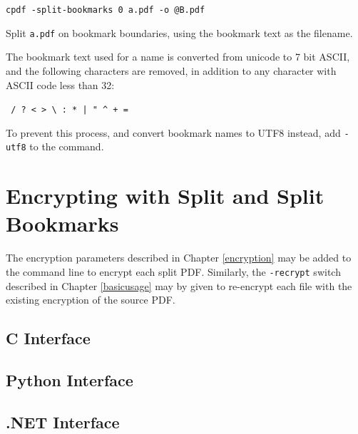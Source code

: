 \documentclass{book}
\begin{document}
  \begin{framed}\small
    \noindent\verb!cpdf -split-bookmarks 0 a.pdf -o @B.pdf!

    \vspace{2.5mm}
    \noindent Split \texttt{a.pdf} on bookmark boundaries, using the bookmark text as the filename.

  \end{framed}
\noindent The bookmark text used for a name is converted from unicode to 7 bit ASCII, and the following characters are removed, in addition to any character with ASCII code less than 32:
  \begin{framed}
  \centering
  \verb! / ? < > \ : * | " ^ + =!
  \end{framed}

\noindent To prevent this process, and convert bookmark names to UTF8 instead, add \texttt{-utf8} to the command.

\section{Encrypting with Split and Split Bookmarks}
The encryption parameters described in Chapter \ref{encryption} may be added to the command line to encrypt each split PDF. Similarly, the \texttt{-recrypt} switch described in Chapter \ref{basicusage} may by given to re-encrypt each file with the existing encryption of the source PDF. 
\pagestyle{empty}\thispagestyle{fancy}

\begin{cpdflib}
\clearpage
\section*{C Interface}
\begin{small}\tt

\end{small}
\end{cpdflib}

\begin{pycpdflib}
\clearpage
\section*{Python Interface}
\begin{small}\tt

\end{small}
\end{pycpdflib}

\begin{dotnetcpdflib}
\clearpage
\section*{.NET Interface}
\begin{small}\tt

\end{small}
\end{dotnetcpdflib}
\end{document}

